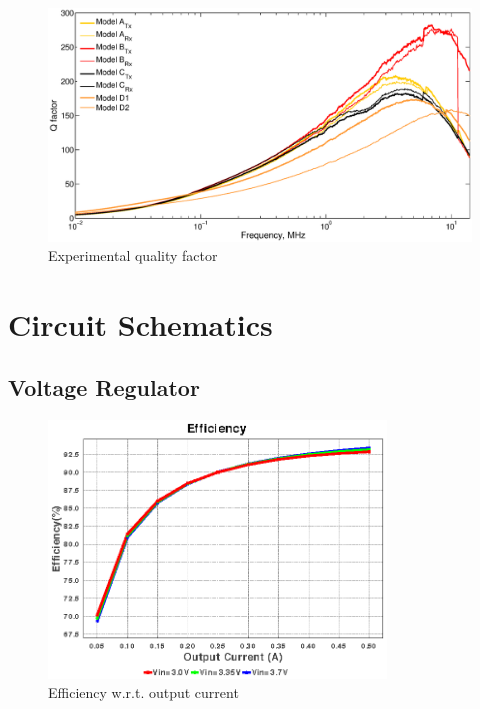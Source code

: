 \begin{figure}[htb]
\centering
\includegraphics[width=1\textwidth]{./images/QFactorall}
\caption{Experimental quality factor}
\label{F:QFactorAll}
\end{figure}






\chapter{Circuit Schematics}

\section{Voltage Regulator}\label{Appendix: DC-DC}


\begin{figure}[htb]
	\begin{center}
		\includegraphics[width=0.8\textwidth]{./images/Efficiency_TPS61088}
	\caption{Efficiency w.r.t. output current}
	\end{center}
\end{figure}

